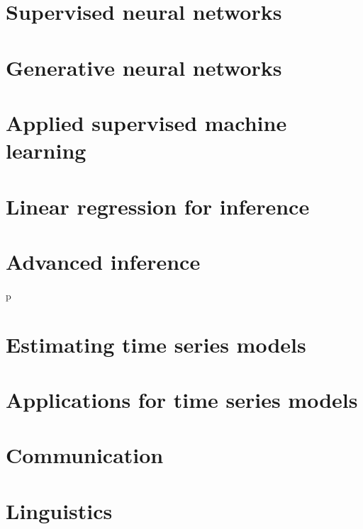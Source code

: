 \documentclass[oneside]{book}
\begin{document}
\part{Supervised neural networks}










\part{Generative neural networks}





\part{Applied supervised machine learning}





\part{Linear regression for inference}






\part{Advanced inference}



p





\part{Estimating time series models}










\part{Applications for time series models}







\part{Communication}







\part{Linguistics}



\end{document}
